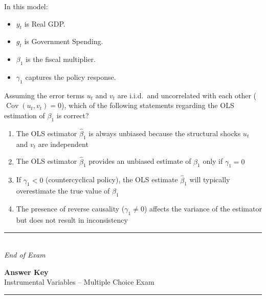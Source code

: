 \documentclass[11pt]{article}
\newcommand{\choices}[4]{%
  \begin{enumerate}[label=(\alph*), leftmargin=2em, itemsep=2pt]
    \item #1
    \item #2
    \item #3
    \item #4
  \end{enumerate}
}
\begin{document}
In this model:
\begin{itemize}[leftmargin=1.5em, itemsep=2pt]
    \item $y_t$ is Real GDP.
    \item $g_t$ is Government Spending.
    \item $\beta_1$ is the fiscal multiplier.
    \item $\gamma_1$ captures the policy response.
\end{itemize}

Assuming the error terms $u_t$ and $v_t$ are i.i.d.\ and uncorrelated with each other ($\operatorname{Cov}(u_t, v_t) = 0$), which of the following statements regarding the OLS estimation of $\beta_1$ is correct?

\choices
{The OLS estimator $\widehat{\beta}_1$ is always unbiased because the structural shocks $u_t$ and $v_t$ are independent}
{The OLS estimator $\widehat{\beta}_1$ provides an unbiased estimate of $\beta_1$ only if $\gamma_1 = 0$}
{If $\gamma_1 < 0$ (countercyclical policy), the OLS estimate $\widehat{\beta}_1$ will typically overestimate the true value of $\beta_1$}
{The presence of reverse causality ($\gamma_1 \neq 0$) affects the variance of the estimator but does not result in inconsistency}

\vfill
\begin{center}
  \rule{0.4\textwidth}{0.4pt}\\[0.3em]
  {\small\textit{End of Exam}}
\end{center}

\newpage

\begin{center}
  {\LARGE\bfseries Answer Key}\\[0.5em]
  {\large Instrumental Variables -- Multiple Choice Exam}\\[0.5em]
  \rule{0.4\textwidth}{0.4pt}
\end{center}

\vspace{1em}
\end{document}
